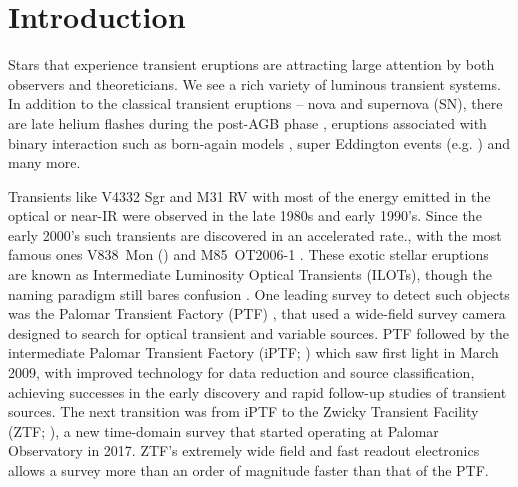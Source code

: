 \documentclass[modern]{aastex62}
\begin{document}
\section{Introduction}
Stars that experience transient eruptions are attracting large attention by both observers and theoreticians.
We see a rich variety of luminous transient systems.
In addition to the classical transient eruptions -- nova and supernova (SN), there are late helium flashes during the post-AGB phase \citep{2005MNRAS.361..695L}, eruptions associated with binary interaction such as born-again models \citep{1984ApJ...277..333I,2001ApJ...554L..71H,2003ApJ...583..913L}, super Eddington events (e.g. \citealt{2009ApJ...697L..49S,2013ApJ...764L...6S,2016MNRAS.462..217S}) and many more.

Transients like V4332 Sgr \citep{1990ApJ...353L..35M,1999AJ....118.1034M,2018ATel11733....1G} and M31 RV \citep{1990ApJ...353L..35M} with most of the energy emitted in the optical or near-IR were observed in the late 1980s and early 1990's.
Since the early 2000's such transients are discovered in an accelerated rate., with the most famous ones V838~Mon (\citealt{2002A&A...389L..51M,2006A&A...451..223T}) and
 \mbox{M85~OT2006-1} \citep{2007Natur.447..458K,2010arXiv1011.1222K}.
These exotic stellar eruptions are known as Intermediate Luminosity Optical Transients (ILOTs), though the naming paradigm still bares confusion \citep{2016RAA....16...99K}.
One leading survey to detect such objects was the Palomar Transient Factory (PTF) \citep{2009PASP..121.1395L}, that used a wide-field survey camera designed to search for optical transient and variable sources.
PTF followed by the intermediate Palomar Transient Factory (iPTF; \citealt{2013ATel.4807....1K}) which saw first light in March 2009, with improved technology for data reduction and source classification, achieving successes in the early discovery and rapid follow-up studies of transient sources.
The next transition was from iPTF to the Zwicky Transient Facility (ZTF; \citealt{2014htu..conf...27B}), a new time-domain survey that started operating at Palomar Observatory in 2017.
ZTF's extremely wide field and fast readout electronics allows a survey more than an order of magnitude faster than that of the PTF.
\end{document}
